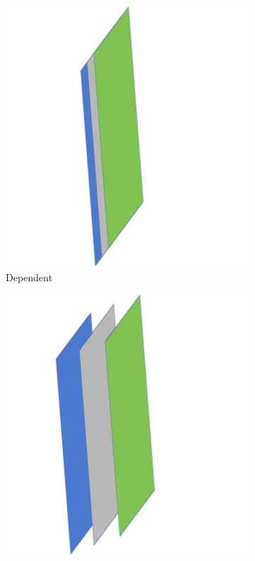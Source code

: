 \documentclass[10pt, journal, letterpaper]{IEEEtran}
\begin{document}
\begin{figure}[hbt!]
    \centering
    \begin{subfigure}{0.49\columnwidth}
          \centering
          \includegraphics[width=\columnwidth]{img/Dependent3D1.png}
          \caption{Dependent}
          \label{fig:linear_systems_dependent}
    \end{subfigure}
    \begin{subfigure}{0.49\columnwidth}
          \centering
          \includegraphics[width=\columnwidth]{img/Inconsistent3D1.png}

\end{subfigure}
\end{figure}
\end{document}
